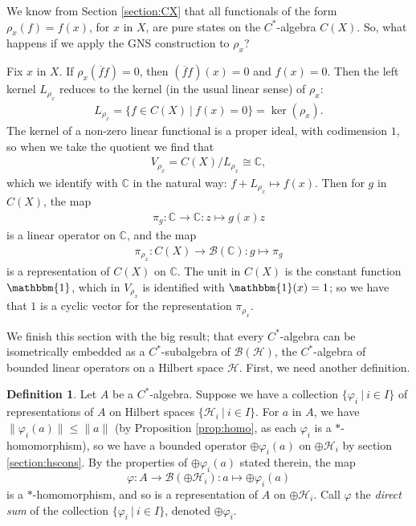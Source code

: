 \documentclass[12pt,a4paper]{report}
\theoremstyle{plain}
\theoremstyle{definition}
\newtheorem{defn}{Definition}
\newcommand{\1}{\mathbbm{1}}
\newcommand{\C}{\mathbb{C}}
\renewcommand{\H}{\mathcal{H}}
\newcommand{\B}{\mathcal{B}}
\newcommand{\BH}{\mathcal{\B(\H)}}
\renewcommand{\phi}{\varphi}
\newcommand{\CX}{C(X)}
\renewcommand{\bar}{\overline}
\begin{document}
We know from Section \ref{section:CX} that all functionals of the form $\rho_x(f) = f(x)$, for $x$ in 
$X$, are pure states on the $C^\ast$-algebra $\CX$. So, what happens if we apply the GNS construction to 
$\rho_x$?

Fix $x$ in $X$. If $\rho_x(\bar f f)=0$, then $(\bar f f)(x)=0$ and $f(x)=0$. Then the left kernel
$L_{\rho_x}$ reduces to the kernel (in the usual linear sense) of $\rho_x$:
\begin{align*}
	L_{\rho_x} = \{f\in\CX ~|~ f(x) = 0\} = \ker(\rho_x).
\end{align*}
The kernel of a non-zero linear functional is a proper ideal, with codimension $1$, so when we take the 
quotient we find that 
\begin{align*}
	V_{\rho_x} = \CX/L_{\rho_x} \cong \C,
\end{align*}
which we identify with $\C$ in the natural way: $f+L_{\rho_x} \mapsto f(x)$.
Then for $g$ in $\CX$, the map 
\begin{align*}
	\pi_g:\C\to\C:z\mapsto g(x)z
\end{align*} 
is a linear operator on $\C$, and the map 
\begin{align*}
	\pi_{\rho_x}:\CX\to\B(\C):g\mapsto\pi_g
\end{align*} 
is a representation of $\CX$ on $\C$.
The unit in $\CX$ is the constant function $\1$, which in $V_{\rho_x}$ is identified with $\1(x)=1$; so 
we have that $1$ is a cyclic vector for the representation $\pi_{\rho_x}$.


We finish this section with the big result; that every $C^\ast$-algebra can be isometrically embedded 
as a $C^\ast$-subalgebra of $\BH$, the $C^\ast$-algebra of bounded linear operators on a Hilbert space 
$\H$. First, we need another definition.
\begin{defn}
	Let $A$ be a $C^\ast$-algebra. Suppose we have a collection $\{\phi_i ~|~i\in I\}$ of 
	representations of $A$ on Hilbert spaces $\{\H_i ~|~ i\in I\}$.
	For $a$ in $A$, we have $\|\phi_i(a)\|\leq \|a\|$ (by Proposition \ref{prop:homo}, as each $\phi_i$ 
	is a $\ast$-homomorphism), so we have a bounded operator $\oplus\phi_i(a)$ on $\oplus \H_i$ by 
	section \ref{section:hscons}. By the properties of $\oplus\phi_i(a)$ stated therein, the map 
	\[
		\phi:A\to \B(\oplus\H_i):a\mapsto\oplus\phi_i(a)
	\]
	is a $\ast$-homomorphism, and so is a representation of $A$ on $\oplus\H_i$. Call $\phi$ the 
	\emph{direct sum} of the collection $\{\phi_i ~|~i\in I\}$, denoted $\oplus\phi_i$.
\end{defn}
\end{document}
